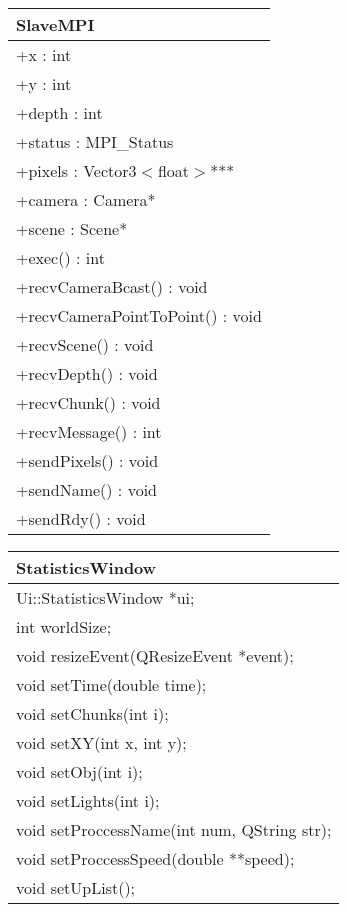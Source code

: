 \begin{center}
    \begin{tabular}{|l|}
    \hline
    SlaveMPI \\ \hline
    +x : int \\ 
	+y : int \\
	+depth : int \\
	+status : MPI\_Status \\
	+pixels : Vector3$<$float$>$*** \\
	+camera : Camera* \\
	+scene : Scene* \\ \hline
	+exec() : int \\
	+recvCameraBcast() : void \\
	+recvCameraPointToPoint() : void \\
	+recvScene() : void \\
	+recvDepth() : void \\
	+recvChunk() : void \\
	+recvMessage() : int \\
	+sendPixels() : void \\
	+sendName() : void \\
	+sendRdy() : void \\
	\hline
    \end{tabular}
\end{center}

\begin{center}
    \begin{tabular}{|l|}
    \hline
    StatisticsWindow \\ \hline
    Ui::StatisticsWindow *ui; \\
    int worldSize; \\
    \hline
	void resizeEvent(QResizeEvent *event); \\
    void setTime(double time); \\
    void setChunks(int i); \\
    void setXY(int x, int y); \\
    void setObj(int i); \\
    void setLights(int i); \\
    void setProccessName(int num, QString str); \\
    void setProccessSpeed(double **speed); \\
    void setUpList(); \\
    \hline
    \end{tabular}
\end{center}


